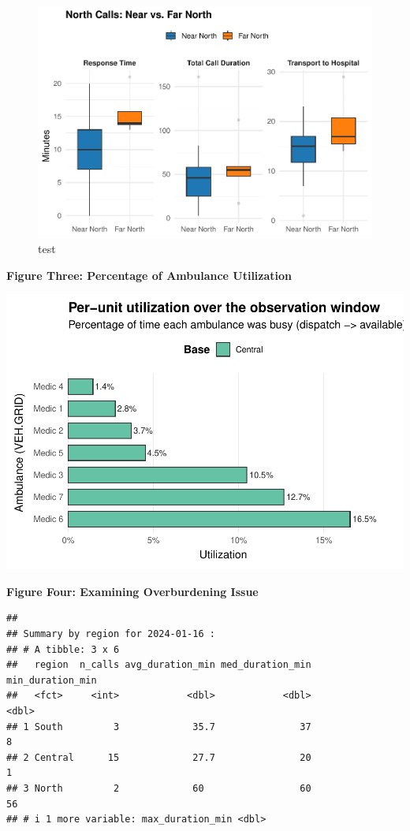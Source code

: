 \documentclass[
  11pt,
]{article}
\begin{document}
\begin{figure}
\centering
\includegraphics{Report_files/figure-latex/eda2_2-1.pdf}
\caption{test}
\end{figure}

\textbf{Figure Three: Percentage of Ambulance Utilization}

\includegraphics{Report_files/figure-latex/eda3-1.pdf}

\textbf{Figure Four: Examining Overburdening Issue}

\begin{verbatim}
## 
## Summary by region for 2024-01-16 :
## # A tibble: 3 x 6
##   region  n_calls avg_duration_min med_duration_min min_duration_min
##   <fct>     <int>            <dbl>            <dbl>            <dbl>
## 1 South         3             35.7               37                8
## 2 Central      15             27.7               20                1
## 3 North         2             60                 60               56
## # i 1 more variable: max_duration_min <dbl>
\end{verbatim}
\end{document}
